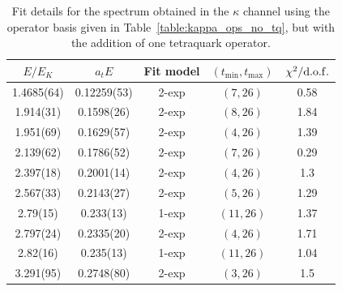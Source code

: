 \begin{table}
  \centering
  \begin{tabular}{c|c|c|c|c}
    $E / E_K$ & $a_t E$ & Fit model & $(t_{\mathrm{min}}, {t_\mathrm{max}})$ & $\chi^2 / \rm{d.o.f.}$\\
    \hline
    1.4685(64)&0.12259(53)&2{-}exp&$(7, 26)$&0.58\\
    1.914(31)&0.1598(26)&2{-}exp&$(8, 26)$&1.84\\
    1.951(69)&0.1629(57)&2{-}exp&$(4, 26)$&1.39\\
    2.139(62)&0.1786(52)&2{-}exp&$(7, 26)$&0.29\\
    2.397(18)&0.2001(14)&2{-}exp&$(4, 26)$&1.3\\
    2.567(33)&0.2143(27)&2{-}exp&$(5, 26)$&1.29\\
    2.79(15)&0.233(13)&1{-}exp&$(11, 26)$&1.37\\
    2.797(24)&0.2335(20)&2{-}exp&$(4, 26)$&1.71\\
    2.82(16)&0.235(13)&1{-}exp&$(11, 26)$&1.04\\
    3.291(95)&0.2748(80)&2{-}exp&$(3, 26)$&1.5
  \end{tabular}
  \caption{Fit details for the spectrum obtained in the $\kappa$ channel using the operator basis given in Table~\ref{table:kappa_ops_no_tq}, but with the addition of one tetraquark operator.}
  \label{table:kappa_with_tq_spectrum}
\end{table}

